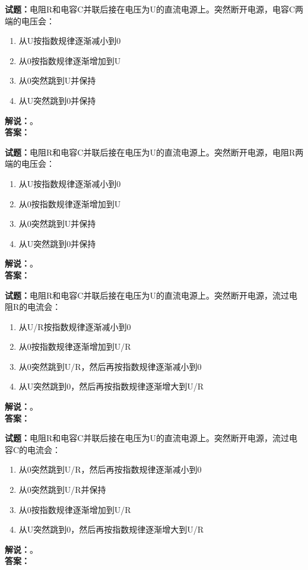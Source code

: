 \documentclass{ctexbook}
\begin{document}
\bigskip

\noindent\textbf{试题：}电阻R和电容C并联后接在电压为U的直流电源上。突然断开电源，电容C两端的电压会：
\begin{enumerate}[leftmargin=3em]
  \item 从U按指数规律逐渐减小到0
  \item 从0按指数规律逐渐增加到U
  \item 从0突然跳到U并保持
  \item 从U突然跳到0并保持
\end{enumerate}
\noindent\textbf{解说：}\textbf{}。\\\noindent\textbf{答案：}

\bigskip

\noindent\textbf{试题：}电阻R和电容C并联后接在电压为U的直流电源上。突然断开电源，电阻R两端的电压会：
\begin{enumerate}[leftmargin=3em]
  \item 从U按指数规律逐渐减小到0
  \item 从0按指数规律逐渐增加到U
  \item 从0突然跳到U并保持
  \item 从U突然跳到0并保持
\end{enumerate}
\noindent\textbf{解说：}\textbf{}。\\\noindent\textbf{答案：}

\bigskip

\noindent\textbf{试题：}电阻R和电容C并联后接在电压为U的直流电源上。突然断开电源，流过电阻R的电流会：
\begin{enumerate}[leftmargin=3em]
  \item 从U/R按指数规律逐渐减小到0
  \item 从0按指数规律逐渐增加到U/R
  \item 从0突然跳到U/R，然后再按指数规律逐渐减小到0
  \item 从U突然跳到0，然后再按指数规律逐渐增大到U/R
\end{enumerate}
\noindent\textbf{解说：}\textbf{}。\\\noindent\textbf{答案：}

\bigskip

\noindent\textbf{试题：}电阻R和电容C并联后接在电压为U的直流电源上。突然断开电源，流过电容C的电流会：
\begin{enumerate}[leftmargin=3em]
  \item 从0突然跳到U/R，然后再按指数规律逐渐减小到0
  \item 从0突然跳到U/R并保持
  \item 从0按指数规律逐渐增加到U/R
  \item 从U突然跳到0，然后再按指数规律逐渐增大到U/R
\end{enumerate}
\noindent\textbf{解说：}\textbf{}。\\\noindent\textbf{答案：}
\end{document}
